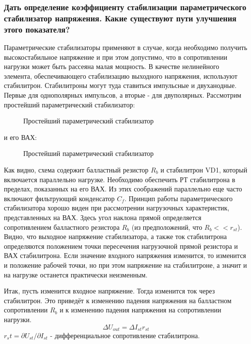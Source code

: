 \subsubsection{Дать определение коэффициенту стабилизации параметрического стабилизатор напряжения. Какие существуют пути улучшения этого показателя?}

Параметрические стабилизаторы применяют в случае, когда необходимо получить высокостабильное напряжение и при этом допустимо, что в сопротивлении нагрузки может быть рассеяна малая мощность. В качестве нелинейного элемента, обеспечивающего стабилизацию выходного напряжения, используют стабилитрон. Стабилитроны могут туда ставиться импульсные и двуханодные. Первые для однополярных импульсов, а вторые - для двуполярных. Рассмотрим простейший параметрический стабилизатор:

\begin{center}
	\begin{figure}[h!]
		\caption{Простейший параметрический стабилизатор}
	\end{figure}
\end{center}

и его ВАХ:

\begin{center}
	\begin{figure}[h!]
		\caption{Простейший параметрический стабилизатор}
	\end{figure}
\end{center}

Как видно, схема содержит балластный резистор $R_b$ и стабилитрон VD1, который включается параллельно нагрузке. Необходимо обеспечить РТ стабилитрона в пределах, показанных на его ВАХ. Из этих соображений параллельно еще часто включают фильтрующий конденсатор $C_f$. Принцип работы параметрического стабилизатора хорошо виден при рассмотрении нагрузочных характеристик, представленных на ВАХ. Здесь угол наклона прямой определяется сопротивлением балластного резистора $R_b$ (из предположений, что $R_b << r_{st} $). Видно, что выходное напряжение стабилизатора, а также ток стабилитрона определяются положением точки пересечения нагрузочной прямой резистора и ВАХ стабилитрона. Если значение входного напряжения изменится, то изменится и положение рабочей точки, но при этом напряжение на стабилитроне, а значит и на нагрузке останется практически неизменным. 

Итак, пусть изменится входное напряжение. Тогда изменится ток через стабилитрон. Это приведёт к изменению падения напряжения на балластном сопротивлении $R_b$ и к изменению падения напряжения на сопротивлении нагрузки.
$$
\Delta U_{out} = \Delta I_{st}r_{st}
$$
$r_st = \partial U_{st}/\partial I_{st}$ - дифференциальное сопротивление стабилитрона.

